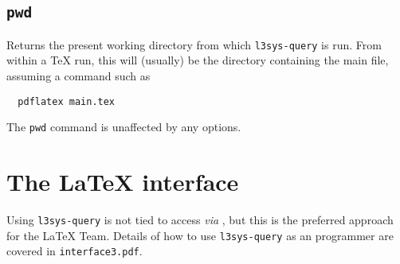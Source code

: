 \documentclass{l3doc}
\begin{document}
\begin{documentation}
\subsection{\texttt{pwd}}

Returns the present working directory from which \texttt{l3sys-query} is run.
From within a \TeX{} run, this will (usually) be the directory containing the
main file, assuming a command such as
\begin{verbatim}
  pdflatex main.tex
\end{verbatim}
The \texttt{pwd} command is unaffected by any options.

\section{The \LaTeX{} interface}

Using \texttt{l3sys-query} is not tied to access \emph{via} , but
this is the preferred approach for the \LaTeX{} Team. Details of how to use
\texttt{l3sys-query} as an  programmer are covered in
\texttt{interface3.pdf}.

\end{documentation}

\PrintIndex
\end{document}
